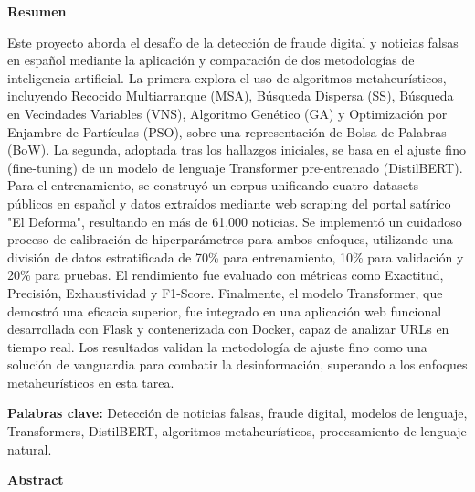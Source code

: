 \thispagestyle{plain}  
\vspace{0.9cm}
\textbf{{\Large Resumen}}
\vspace{0.9cm}

Este proyecto aborda el desafío de la detección de fraude digital y noticias falsas en español mediante la aplicación y comparación de dos metodologías de inteligencia artificial. La primera explora el uso de algoritmos metaheurísticos, incluyendo Recocido Multiarranque (MSA), Búsqueda Dispersa (SS), Búsqueda en Vecindades Variables (VNS), Algoritmo Genético (GA) y Optimización por Enjambre de Partículas (PSO), sobre una representación de Bolsa de Palabras (BoW). La segunda, adoptada tras los hallazgos iniciales, se basa en el ajuste fino (fine-tuning) de un modelo de lenguaje Transformer pre-entrenado (DistilBERT). Para el entrenamiento, se construyó un corpus unificando cuatro datasets públicos en español y datos extraídos mediante web scraping del portal satírico "El Deforma", resultando en más de 61,000 noticias. Se implementó un cuidadoso proceso de calibración de hiperparámetros para ambos enfoques, utilizando una división de datos estratificada de 70\% para entrenamiento, 10\% para validación y 20\% para pruebas. El rendimiento fue evaluado con métricas como Exactitud, Precisión, Exhaustividad y F1-Score. Finalmente, el modelo Transformer, que demostró una eficacia superior, fue integrado en una aplicación web funcional desarrollada con Flask y contenerizada con Docker, capaz de analizar URLs en tiempo real. Los resultados validan la metodología de ajuste fino como una solución de vanguardia para combatir la desinformación, superando a los enfoques metaheurísticos en esta tarea.

\vspace{0.9cm}
\textbf{Palabras clave:} Detección de noticias falsas, fraude digital, modelos de lenguaje, Transformers, DistilBERT, algoritmos metaheurísticos, procesamiento de lenguaje natural.

\shipout\null
\newpage

\thispagestyle{plain}  
\vspace{0.9cm}
\textbf{{\Large Abstract}}
\vspace{0.9cm}

